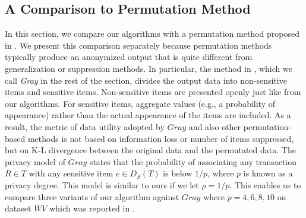 \subsection{A Comparison to Permutation Method}
In this section, we compare our algorithms with a permutation method
proposed in \cite{2011:TKDE:Anonymous}. We present this comparison separately
because permutation methods typically produce an anonymized output that
is quite different from generalization or suppression methods. In particular,
the method in \cite{2011:TKDE:Anonymous}, which we call {\em Gray}
in the rest of the section, divides the output data into non-sensitive
items and sensitive items. Non-sensitive items are presented openly just like
from our algorithms. For sensitive items, aggregate values (e.g.,
a probability of appearance) rather than the actual appearance of the
items are included. As a result, the metric of data utility adopted by
$Gray$ and also other permutation-based methods is not based on information
loss or number of items suppressed, but on K-L divergence between
the original data and the permutated data. The privacy model of $Gray$
states that the probability of associating any transaction $R \in T$ with
any sensitive item $e \in D_S(T)$ is below $1/p$, where $p$ is known as
a privacy degree. This model is similar to ours if we let $\rho = 1/p$.
This enables us to compare three variants of our algorithm against
$Gray$ where $p=4, 6, 8, 10$ on dataset $WV$ which was reported in
\cite{2011:TKDE:Anonymous}.

